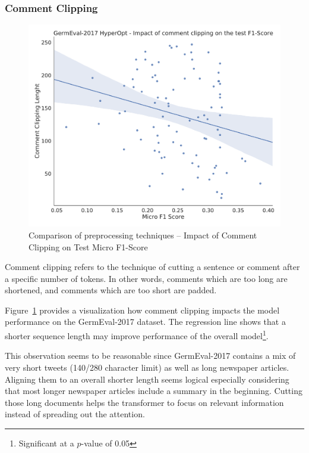 \subsubsection{Comment Clipping}
\label{subsec:06_CommentClipping}

\begin{figure}
    \centering
    \includegraphics[width=\textwidth]{figures/06_results/06_hp_ge_lm_commentClipping_test}
    \caption{Comparison of preprocessing techniques -- Impact of Comment Clipping on Test Micro F1-Score}
    \label{fig:06_PreprocessingCommentClipping}
\end{figure}

Comment clipping refers to the technique of cutting a sentence or comment after a specific number of tokens. In other words, comments which are too long are shortened, and comments which are too short are padded.

Figure~\ref{fig:06_PreprocessingCommentClipping} provides a visualization how comment clipping impacts the model performance on the GermEval-2017 dataset. The regression line shows that a shorter sequence length may improve performance of the overall model\footnote{Significant at a $p$-value of 0.05}.
\medskip

This observation seems to be reasonable since GermEval-2017 contains a mix of very short tweets {(140/280 character limit)} as well as long newspaper articles. Aligning them to an overall shorter length seems logical especially considering that most longer newspaper articles include a summary in the beginning. Cutting those long documents helps the transformer to focus on relevant information instead of spreading out the attention.

